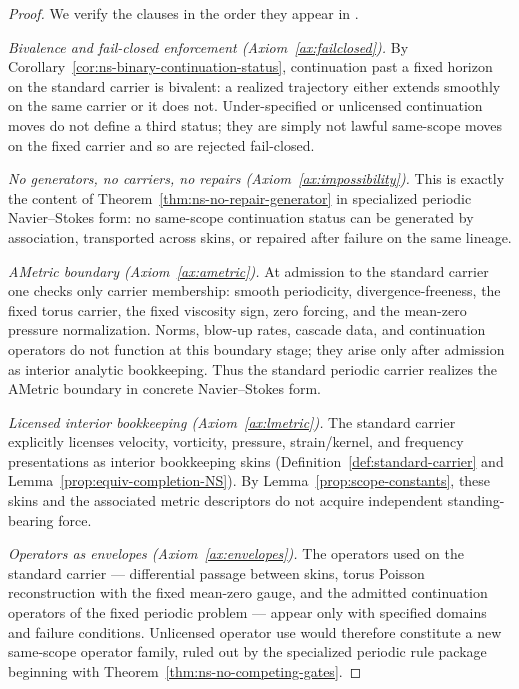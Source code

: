 \begin{proof}
We verify the clauses in the order they appear in .

\smallskip
\noindent\textit{Bivalence and fail-closed enforcement (Axiom~\ref{ax:failclosed}).}
By Corollary~\ref{cor:ns-binary-continuation-status}, continuation past a fixed horizon on the
standard carrier is bivalent: a realized trajectory either extends smoothly on the same carrier or it
does not. Under-specified or unlicensed continuation moves do not define a third status; they are
simply not lawful same-scope moves on the fixed carrier and so are rejected fail-closed.

\smallskip
\noindent\textit{No generators, no carriers, no repairs (Axiom~\ref{ax:impossibility}).}
This is exactly the content of Theorem~\ref{thm:ns-no-repair-generator} in specialized periodic
Navier--Stokes form: no same-scope continuation status can be generated by association, transported
across skins, or repaired after failure on the same lineage.

\smallskip
\noindent\textit{AMetric boundary (Axiom~\ref{ax:ametric}).}
At admission to the standard carrier one checks only carrier membership: smooth periodicity,
divergence-freeness, the fixed torus carrier, the fixed viscosity sign, zero forcing, and the
mean-zero pressure normalization. Norms, blow-up rates, cascade data, and continuation operators do
not function at this boundary stage; they arise only after admission as interior analytic bookkeeping.
Thus the standard periodic carrier realizes the AMetric boundary in concrete Navier--Stokes form.

\smallskip
\noindent\textit{Licensed interior bookkeeping (Axiom~\ref{ax:lmetric}).}
The standard carrier explicitly licenses velocity, vorticity, pressure, strain/kernel, and frequency
presentations as interior bookkeeping skins (Definition~\ref{def:standard-carrier} and
Lemma~\ref{prop:equiv-completion-NS}). By Lemma~\ref{prop:scope-constants}, these skins and the
associated metric descriptors do not acquire independent standing-bearing force.

\smallskip
\noindent\textit{Operators as envelopes (Axiom~\ref{ax:envelopes}).}
The operators used on the standard carrier --- differential passage between skins, torus Poisson
reconstruction with the fixed mean-zero gauge, and the admitted continuation operators of the fixed
periodic problem --- appear only with specified domains and failure conditions. Unlicensed operator
use would therefore constitute a new same-scope operator family, ruled out by the specialized periodic
rule package beginning with Theorem~\ref{thm:ns-no-competing-gates}.


\end{proof}
